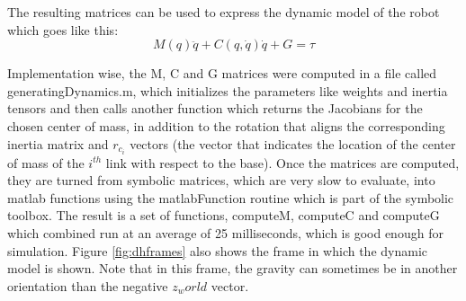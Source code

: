The resulting matrices can be used to express the dynamic model of the robot which goes like this:
$$
    M(q) \ddot{q} + C(q, \dot{q}) \dot{q} + G = \tau
$$

Implementation wise, the M, C and G matrices were computed in a file called generatingDynamics.m, which initializes the parameters like weights and inertia tensors and then calls another function which returns the Jacobians for the chosen center of mass, in addition to the rotation that aligns the corresponding inertia matrix and $r_{c_i}$ vectors (the vector that indicates the location of the center of mass of the $i^{th}$ link with respect to the base). Once the matrices are computed, they are turned from symbolic matrices, which are very slow to evaluate, into matlab functions using the matlabFunction routine which is part of the symbolic toolbox. The result is a set of functions, computeM, computeC and computeG which combined run at an average of 25 milliseconds, which is good enough for simulation. Figure \ref{fig:dhframes} also shows the frame in which the dynamic model is shown. Note that in this frame, the gravity can sometimes be in another orientation than the negative $z_world$ vector.